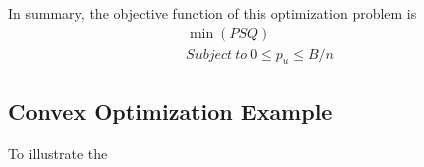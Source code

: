 \documentclass[times, 10pt,twocolumn]{article}
\begin{document}
In summary, the objective function of this optimization problem is
\begin{equation}
\begin{split}
\min(PSQ)\\ Subject\ to\ 0 \leq p_u \leq B/n
\end{split}
\end{equation}

\subsection{Convex Optimization Example}
To illustrate the 
%
%
\end{document}
